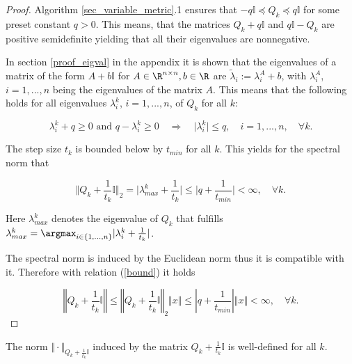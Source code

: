 \begin{proof}
	
	Algorithm \ref{sec_variable_metric}.1 ensures that \( -q \mathbb{I}  \preccurlyeq Q_k \preccurlyeq q\mathbb{I} \) for some preset constant \(q >0\). This means, that the matrices \(Q_k + q\mathbb{I} \) and \(q \mathbb{I} - Q_k \) are positive semidefinite yielding that all their eigenvalues are nonnegative.
	
In section \ref{proof_eigval} in the appendix it is shown that the eigenvalues of a matrix of the form \(A+b\mathbb{I}\) for \(A \in \R^{n\times n}, b \in \R\) are \(\tilde{\lambda}_i := \lambda^A_i+b \), with \(\lambda^A_i\), \(i =1,...,n\) being the eigenvalues of the matrix \(A\).
This means that the following holds for all eigenvalues \(\lambda^k_{i}\), \(i = 1,...,n\), of \(Q_k\) for all \(k\):

\begin{equation*}
	\lambda^k_{i} + q \geq 0 \text{ and } q - \lambda^k_{i} \geq 0 \quad \Rightarrow \quad \vert \lambda^k_{i} \vert \leq q, \quad  i = 1,...,n, \quad  \forall k.
\end{equation*}
	
The step size \(t_k\) is bounded below by \(t_{min}\) for all \(k\). This yields for the spectral norm that

\begin{equation}
		\Vert Q_k+\frac{1}{t_k}\mathbb{I} \Vert_2 =  \vert \lambda^k_{max}+\frac{1}{t_k} \vert \leq \vert q+\frac{1}{t_{min}} \vert < \infty, \quad \forall k.
		\label{bound}
\end{equation}

Here \(\lambda^k_{max}\) denotes the eigenvalue of \(Q_k\)  that fulfills \(\lambda^k_{max} = \argmax_{i \in \{1,...,n\}} \vert \lambda^k_{i}+\frac{1}{t_k} \vert\).

The spectral norm is induced by the Euclidean norm thus it is compatible with it. Therefore with relation (\ref{bound}) it holds

\[ \left\Vert Q_k+\frac{1}{t_k}\mathbb{I} \right\Vert \leq \left\Vert Q_k+\frac{1}{t_k}\mathbb{I} \right\Vert_2 \Vert x \Vert \leq \left\vert q+\frac{1}{t_{min}} \right\vert \Vert x \Vert< \infty , \quad \forall k.\]

\end{proof}



\begin{proposition}
\label{prop_norm}
	The norm \(\Vert \cdot \Vert_{Q_k+\frac{1}{t_k}\mathbb{I}}\) induced by the matrix \(Q_k+\frac{1}{t_k}\mathbb{I}\) is well-defined for all \(k\).
\end{proposition}

